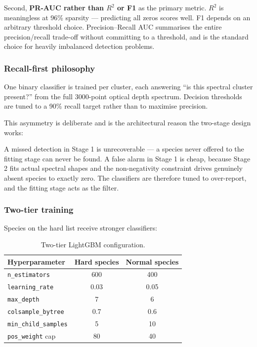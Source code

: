 \documentclass[11pt,a4paper]{article}
\newcommand{\code}[1]{\texttt{\small #1}}
\begin{document}
Second, \textbf{PR-AUC rather than $R^2$ or F1} as the primary metric.
$R^2$ is meaningless at 96\% sparsity --- predicting all zeros scores well.
F1 depends on an arbitrary threshold choice. Precision--Recall AUC
summarises the entire precision/recall trade-off without committing to a
threshold, and is the standard choice for heavily imbalanced detection
problems.

\subsubsection*{Recall-first philosophy}

One binary classifier is trained per cluster, each answering ``is this
spectral cluster present?'' from the full 3000-point optical depth
spectrum. Decision thresholds are tuned to a 90\% recall target rather than
to maximise precision.

This asymmetry is deliberate and is the architectural reason the two-stage
design works:

\begin{keybox}
A missed detection in Stage 1 is unrecoverable --- a species never offered
to the fitting stage can never be found. A false alarm in Stage 1 is
cheap, because Stage 2 fits actual spectral shapes and the non-negativity
constraint drives genuinely absent species to exactly zero. The classifiers
are therefore tuned to over-report, and the fitting stage acts as the
filter.
\end{keybox}

\subsubsection*{Two-tier training}

Species on the hard list receive stronger classifiers:

\begin{table}[H]
\centering
\small
\begin{tabular}{@{}lcc@{}}
\toprule
\textbf{Hyperparameter} & \textbf{Hard species} & \textbf{Normal species} \\
\midrule
\code{n\_estimators}      & 600  & 400  \\
\code{learning\_rate}     & 0.03 & 0.05 \\
\code{max\_depth}         & 7    & 6    \\
\code{colsample\_bytree}  & 0.7  & 0.6  \\
\code{min\_child\_samples}& 5    & 10   \\
\code{pos\_weight} cap    & 80   & 40   \\
\bottomrule
\end{tabular}
\caption{Two-tier LightGBM configuration.}
\end{table}
\end{document}
